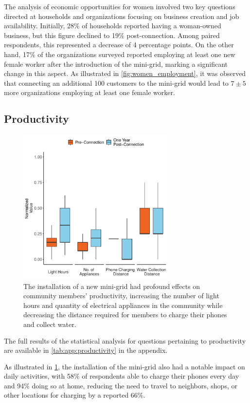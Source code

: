 The analysis of economic opportunities for women involved two key questions directed at households and organizations focusing on business creation and job availability. Initially, 28\% of households reported having a woman-owned business, but this figure declined to 19\% post-connection. Among paired respondents, this represented a decrease of 4 percentage points. On the other hand, 17\% of the organizations surveyed reported employing at least one new female worker after the introduction of the mini-grid, marking a significant change in this aspect. As illustrated in \cref{fig:women_employment}, it was observed that connecting an additional 100 customers to the mini-grid would lead to $7\pm5$ more organizations employing at least one female worker.

\subsection{Productivity}
\begin{figure}[th]
    \centering
    \includegraphics[width=0.7\textwidth]{images/productivity_paired_results.pdf}
    \caption{The installation of a new mini-grid had profound effects on community members' productivity, increasing the number of light hours and quantity of electrical appliances in the community while decreasing the distance required for members to charge their phones and collect water.}
    \label{fig:productivity_paired_results}
\end{figure}
The full results of the statistical analysis for questions pertaining to productivity are available in \cref{tab:app:productivity} in the appendix.

As illustrated in \cref{fig:productivity_paired_results}, the installation of the mini-grid also had a notable impact on daily activities, with 58\% of respondents able to charge their phones every day and 94\% doing so at home, reducing the need to travel to neighbors, shops, or other locations for charging by a reported 66\%.


